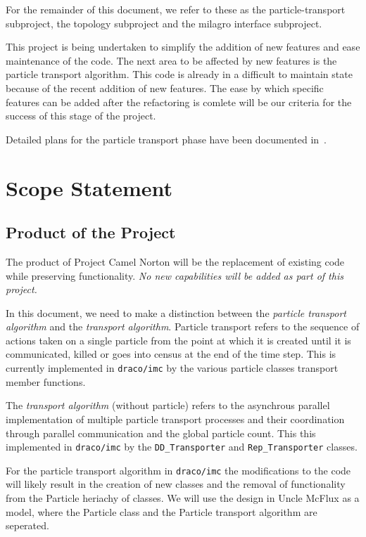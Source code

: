 \documentclass[11pt]{nmemo}
\begin{document}
For the remainder of this document, we refer to these as the
particle-transport subproject, the topology subproject and the milagro
interface subproject.

This project is being undertaken to simplify the addition of new
features and ease maintenance of the code. The next area to be
affected by new features is the particle transport algorithm.  This
code is already in a difficult to maintain state because of the recent
addition of new features. The ease by which specific features can be
added after the refactoring is comlete will be our criteria for the
success of this stage of the project. 

Detailed plans for the particle transport phase have been documented
in~\cite{ccs-4:04-14}.

\newpage
\section*{Scope Statement}


\subsection*{Product of the Project}

The product of Project Camel Norton will be the replacement of
existing code while preserving functionality. {\em No new capabilities
  will be added as part of this project.}

In this document, we need to make a distinction between the {\em
  particle transport algorithm} and the {\em transport algorithm}.
Particle transport refers to the sequence of actions taken on a single
particle from the point at which it is created until it is
communicated, killed or goes into census at the end of the time step.
This is currently implemented in {\tt draco/imc} by the various
particle classes transport member functions.  

The {\em transport algorithm} (without particle) refers to the
asynchrous parallel implementation of multiple particle transport
processes and their coordination through parallel communication and
the global particle count. This this implemented in {\tt draco/imc} by
the {\tt DD\_Transporter} and {\tt Rep\_Transporter} classes.

For the particle transport algorithm in {\tt draco/imc} the
modifications to the code will likely result in the creation of new
classes and the removal of functionality from the Particle heriachy of
classes. We will use the design in Uncle McFlux as a model, where the
Particle class and the Particle transport algorithm are seperated.
\end{document}
